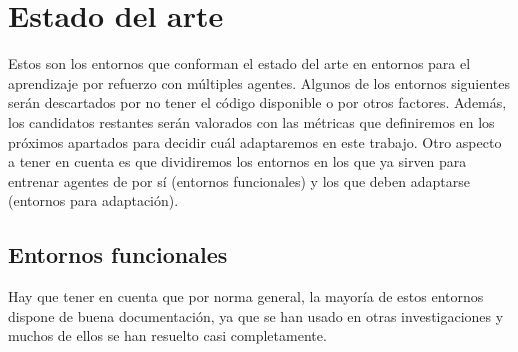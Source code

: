 \chapter{Estado del arte}
\label{section:Estado del arte}
Estos son los entornos que conforman el estado del arte en entornos para el aprendizaje por refuerzo con múltiples agentes. Algunos de los entornos siguientes serán descartados por no tener el código disponible o por otros factores. Además, los candidatos restantes serán valorados con las métricas que definiremos en los próximos apartados para decidir cuál adaptaremos en este trabajo. Otro aspecto a tener en cuenta es que dividiremos los entornos en los que ya sirven para entrenar agentes de por sí (entornos funcionales) y los que deben adaptarse (entornos para adaptación).  

\section{Entornos funcionales}

Hay que tener en cuenta que por norma general, la mayoría de estos entornos dispone de buena documentación, ya que se han usado en otras investigaciones y muchos de ellos se han resuelto casi completamente.

